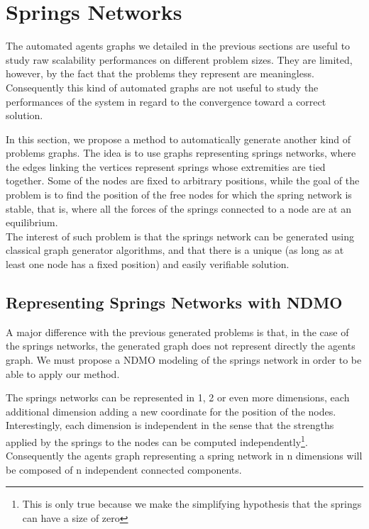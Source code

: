 \section{Springs Networks}

The automated agents graphs we detailed in the previous sections are useful to study raw scalability performances on different problem sizes. They are limited, however, by the fact that the problems they represent are meaningless. Consequently this kind of automated graphs are not useful to study the performances of the system in regard to the convergence toward a correct solution.

In this section, we propose a method to automatically generate another kind of problems graphs. The idea is to use graphs representing springs networks, where the edges linking the vertices represent springs whose extremities are tied together. Some of the nodes are fixed to arbitrary positions, while the goal of the problem is to find the position of the free nodes for which the spring network is stable, that is, where all the forces of the springs connected to a node are at an equilibrium.\\
The interest of such problem is that the springs network can be generated using classical graph generator algorithms, and that there is a unique (as long as at least one node has a fixed position) and easily verifiable solution.

\subsection{Representing Springs Networks with NDMO}

A major difference with the previous generated problems is that, in the case of the springs networks, the generated graph does not represent directly the agents graph. We must propose a NDMO modeling of the springs network in order to be able to apply our method.

The springs networks can be represented in 1, 2 or even more dimensions, each additional dimension adding a new coordinate for the position of the nodes. Interestingly, each dimension is independent in the sense that the strengths applied by the springs to the nodes can be computed independently\footnote{This is only true because we make the simplifying hypothesis that the springs can have a size of zero}. Consequently the agents graph representing a spring network in n dimensions will be composed of n independent connected components.


